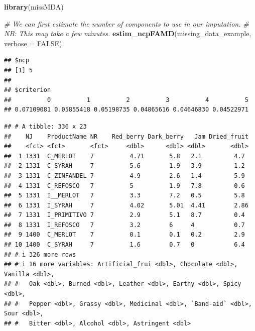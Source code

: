 \documentclass[
]{book}
\newenvironment{Shaded}{\begin{snugshade}}{\end{snugshade}}
\newcommand{\AttributeTok}[1]{\textcolor[rgb]{0.13,0.29,0.53}{#1}}
\newcommand{\CommentTok}[1]{\textcolor[rgb]{0.56,0.35,0.01}{\textit{#1}}}
\newcommand{\ConstantTok}[1]{\textcolor[rgb]{0.56,0.35,0.01}{#1}}
\newcommand{\DecValTok}[1]{\textcolor[rgb]{0.00,0.00,0.81}{#1}}
\newcommand{\FunctionTok}[1]{\textcolor[rgb]{0.13,0.29,0.53}{\textbf{#1}}}
\newcommand{\NormalTok}[1]{#1}
\newcommand{\OtherTok}[1]{\textcolor[rgb]{0.56,0.35,0.01}{#1}}
\newcommand{\SpecialCharTok}[1]{\textcolor[rgb]{0.81,0.36,0.00}{\textbf{#1}}}
\begin{document}
\begin{Shaded}
\begin{Highlighting}[]
\FunctionTok{library}\NormalTok{(missMDA)}

\CommentTok{\# We can first estimate the number of components to use in our imputation.}
\CommentTok{\# NB: This may take a few minutes.}
\FunctionTok{estim\_ncpFAMD}\NormalTok{(missing\_data\_example, }\AttributeTok{verbose =} \ConstantTok{FALSE}\NormalTok{)}
\end{Highlighting}
\end{Shaded}

\begin{verbatim}
## $ncp
## [1] 5
## 
## $criterion
##          0          1          2          3          4          5 
## 0.07109081 0.05855418 0.05198735 0.04865616 0.04646830 0.04522971
\end{verbatim}

\begin{Shaded}
\end{Shaded}

\begin{verbatim}
## # A tibble: 336 x 23
##    NJ    ProductName NR    Red_berry Dark_berry   Jam Dried_fruit
##    <fct> <fct>       <fct>     <dbl>      <dbl> <dbl>       <dbl>
##  1 1331  C_MERLOT    7          4.71       5.8   2.1         4.7 
##  2 1331  C_SYRAH     7          5.6        1.9   3.9         1.2 
##  3 1331  C_ZINFANDEL 7          4.9        2.6   1.4         5.9 
##  4 1331  C_REFOSCO   7          5          1.9   7.8         0.6 
##  5 1331  I__MERLOT   7          3.3        7.2   0.5         5.8 
##  6 1331  I_SYRAH     7          4.02       5.01  4.41        2.86
##  7 1331  I_PRIMITIVO 7          2.9        5.1   8.7         0.4 
##  8 1331  I_REFOSCO   7          3.2        6     4           0.7 
##  9 1400  C_MERLOT    7          0.1        0.1   0.2         2.9 
## 10 1400  C_SYRAH     7          1.6        0.7   0           6.4 
## # i 326 more rows
## # i 16 more variables: Artificial_frui <dbl>, Chocolate <dbl>, Vanilla <dbl>,
## #   Oak <dbl>, Burned <dbl>, Leather <dbl>, Earthy <dbl>, Spicy <dbl>,
## #   Pepper <dbl>, Grassy <dbl>, Medicinal <dbl>, `Band-aid` <dbl>, Sour <dbl>,
## #   Bitter <dbl>, Alcohol <dbl>, Astringent <dbl>
\end{verbatim}
\end{document}
